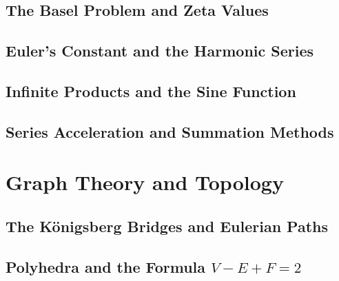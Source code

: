 \documentclass[11pt,a4paper,twoside]{book}
\theoremstyle{eulerstyle}
\theoremstyle{definition}
\begin{document}
\chapter{The Basel Problem and Zeta Values}
\label{ch:basel}


\cleardoublepage

\chapter{Euler's Constant and the Harmonic Series}
\label{ch:euler_constant}


\cleardoublepage

\chapter{Infinite Products and the Sine Function}
\label{ch:infinite_products}


\cleardoublepage

\chapter{Series Acceleration and Summation Methods}
\label{ch:acceleration}
%

\cleardoublepage

\part{Graph Theory and Topology}
\parttoc

\chapter{The Königsberg Bridges and Eulerian Paths}
\label{ch:konigsberg}


\cleardoublepage

\chapter{Polyhedra and the Formula $V - E + F = 2$}
\label{ch:polyhedra}

\end{document}
